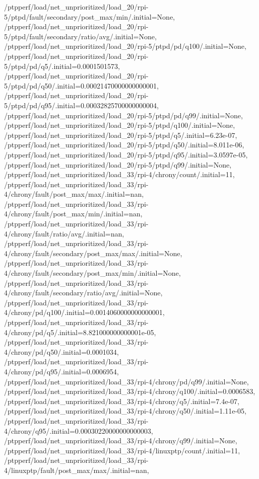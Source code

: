 {    /ptpperf/load/net_unprioritized/load_20/rpi-5/ptpd/fault/secondary/post_max/min/.initial=None,
    /ptpperf/load/net_unprioritized/load_20/rpi-5/ptpd/fault/secondary/ratio/avg/.initial=None,
    /ptpperf/load/net_unprioritized/load_20/rpi-5/ptpd/pd/q100/.initial=None,
    /ptpperf/load/net_unprioritized/load_20/rpi-5/ptpd/pd/q5/.initial=0.0001501573,
    /ptpperf/load/net_unprioritized/load_20/rpi-5/ptpd/pd/q50/.initial=0.00021470000000000001,
    /ptpperf/load/net_unprioritized/load_20/rpi-5/ptpd/pd/q95/.initial=0.00032825700000000004,
    /ptpperf/load/net_unprioritized/load_20/rpi-5/ptpd/pd/q99/.initial=None,
    /ptpperf/load/net_unprioritized/load_20/rpi-5/ptpd/q100/.initial=None,
    /ptpperf/load/net_unprioritized/load_20/rpi-5/ptpd/q5/.initial=6.23e-07,
    /ptpperf/load/net_unprioritized/load_20/rpi-5/ptpd/q50/.initial=8.011e-06,
    /ptpperf/load/net_unprioritized/load_20/rpi-5/ptpd/q95/.initial=3.0597e-05,
    /ptpperf/load/net_unprioritized/load_20/rpi-5/ptpd/q99/.initial=None,
    /ptpperf/load/net_unprioritized/load_33/rpi-4/chrony/count/.initial=11,
    /ptpperf/load/net_unprioritized/load_33/rpi-4/chrony/fault/post_max/max/.initial=nan,
    /ptpperf/load/net_unprioritized/load_33/rpi-4/chrony/fault/post_max/min/.initial=nan,
    /ptpperf/load/net_unprioritized/load_33/rpi-4/chrony/fault/ratio/avg/.initial=nan,
    /ptpperf/load/net_unprioritized/load_33/rpi-4/chrony/fault/secondary/post_max/max/.initial=None,
    /ptpperf/load/net_unprioritized/load_33/rpi-4/chrony/fault/secondary/post_max/min/.initial=None,
    /ptpperf/load/net_unprioritized/load_33/rpi-4/chrony/fault/secondary/ratio/avg/.initial=None,
    /ptpperf/load/net_unprioritized/load_33/rpi-4/chrony/pd/q100/.initial=0.0014060000000000001,
    /ptpperf/load/net_unprioritized/load_33/rpi-4/chrony/pd/q5/.initial=8.821000000000001e-05,
    /ptpperf/load/net_unprioritized/load_33/rpi-4/chrony/pd/q50/.initial=0.0001034,
    /ptpperf/load/net_unprioritized/load_33/rpi-4/chrony/pd/q95/.initial=0.0006954,
    /ptpperf/load/net_unprioritized/load_33/rpi-4/chrony/pd/q99/.initial=None,
    /ptpperf/load/net_unprioritized/load_33/rpi-4/chrony/q100/.initial=0.0006583,
    /ptpperf/load/net_unprioritized/load_33/rpi-4/chrony/q5/.initial=7.4e-07,
    /ptpperf/load/net_unprioritized/load_33/rpi-4/chrony/q50/.initial=1.11e-05,
    /ptpperf/load/net_unprioritized/load_33/rpi-4/chrony/q95/.initial=0.00030220000000000003,
    /ptpperf/load/net_unprioritized/load_33/rpi-4/chrony/q99/.initial=None,
    /ptpperf/load/net_unprioritized/load_33/rpi-4/linuxptp/count/.initial=11,
    /ptpperf/load/net_unprioritized/load_33/rpi-4/linuxptp/fault/post_max/max/.initial=nan,
}
